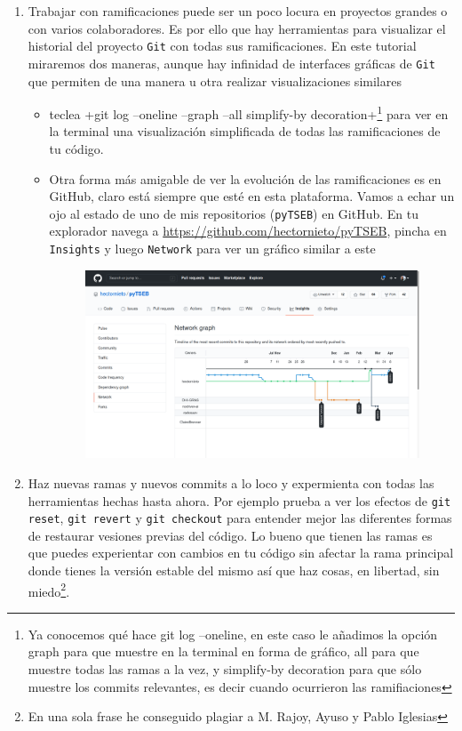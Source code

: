 \documentclass[a4paper,10pt]{article}
\begin{document}
\begin{enumerate}
    \item Trabajar con ramificaciones puede ser un poco locura en proyectos grandes o con varios colaboradores. Es por ello que hay herramientas para visualizar el historial del proyecto \verb+Git+ con todas sus ramificaciones. En este tutorial miraremos dos maneras, aunque hay infinidad de interfaces gráficas de \verb+Git+ que permiten de una manera u otra realizar visualizaciones similares
    \begin{itemize}
     \item teclea \cverb+git log --oneline --graph --all simplify-by decoration+\footnote{Ya conocemos qué hace git log --oneline, en este caso le añadimos la opción graph para que muestre en la terminal en forma de gráfico, all para que muestre todas las ramas a la vez, y  simplify-by decoration para que sólo muestre los commits relevantes, es decir cuando ocurrieron las ramifiaciones} para ver en la terminal una visualización simplificada de todas las ramificaciones de tu código.
     \item Otra forma más amigable de ver la evolución de las ramificaciones es en GitHub, claro está siempre que esté en esta plataforma. Vamos a echar un ojo al estado de uno de mis repositorios (\verb+pyTSEB+) en GitHub. 
     En tu explorador navega a \url{https://github.com/hectornieto/pyTSEB}, pincha en \verb+Insights+ y luego \verb+Network+ para ver un gráfico similar a este
     \begin{figure}[H]
      \includegraphics[width=\columnwidth]{pyTSEB_branches.png}
     \end{figure}
    \end{itemize}

    \item Haz nuevas ramas y nuevos commits a lo loco y expermienta con todas las herramientas hechas hasta ahora. Por ejemplo prueba a ver los efectos de \verb+git reset+, \verb+git revert+ y \verb+git checkout+ para entender mejor las diferentes formas de restaurar vesiones previas del código. Lo bueno que tienen las ramas es que puedes experientar con cambios en tu código sin afectar la rama principal donde tienes la versión estable del mismo así que haz cosas, en libertad, sin miedo\footnote{En una sola frase he conseguido plagiar a M. Rajoy, Ayuso y Pablo Iglesias}.
    \end{enumerate}
    
\end{document}
